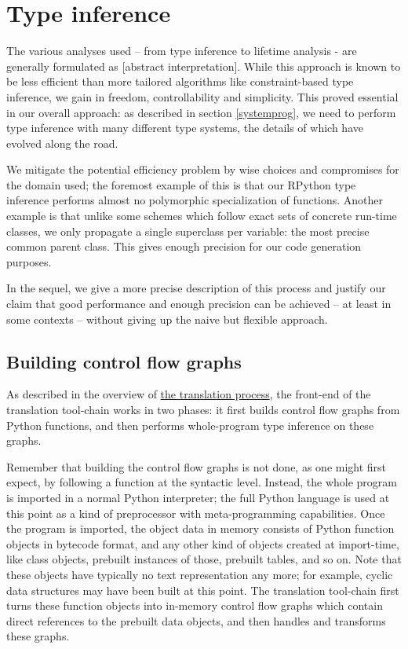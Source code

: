 \documentclass{acm_proc_article-sp}
\begin{document}
\section{Type inference}
\label{typeinference}


The various analyses used -- from type inference to lifetime analysis -
are generally formulated as [abstract interpretation].  While this
approach is known to be less efficient than more tailored algorithms
like constraint-based type inference, we gain in freedom,
controllability and simplicity.  This proved essential in our overall
approach: as described in section \ref{systemprog}, we need to perform
type inference with many different type systems, the details of which
have evolved along the road.

We mitigate the potential efficiency problem by wise choices and
compromises for the domain used; the foremost example of this is that
our RPython type inference performs almost no polymorphic specialization
of functions.  Another example is that unlike some schemes which follow
exact sets of concrete run-time classes, we only propagate a single
superclass per variable: the most precise common parent class.  This
gives enough precision for our code generation purposes.

In the sequel, we give a more precise description of this process and
justify our claim that good performance and enough precision can be
achieved -- at least in some contexts -- without giving up the naive but
flexible approach.


\subsection{Building control flow graphs}
\label{flowobjspace}
\hypertarget{flowobjspace}{}

As described in the overview of \href{\#the-translation-process}{the
translation process}, the front-end of the translation tool-chain
works in two phases: it first builds control flow graphs from Python
functions, and then performs whole-program type inference on these
graphs.

Remember that building the control flow graphs is not done, as one might
first expect, by following a function at the syntactic level.  Instead,
the whole program is imported in a normal Python interpreter; the full
Python language is used at this point as a kind of preprocessor with
meta-programming capabilities.  Once the program is imported, the object
data in memory consists of Python function objects in bytecode format,
and any other kind of objects created at import-time, like class
objects, prebuilt instances of those, prebuilt tables, and so on.  Note
that these objects have typically no text representation any more; for
example, cyclic data structures may have been built at this point.  The
translation tool-chain first turns these function objects into in-memory
control flow graphs which contain direct references to the prebuilt data
objects, and then handles and transforms these graphs.
\end{document}
